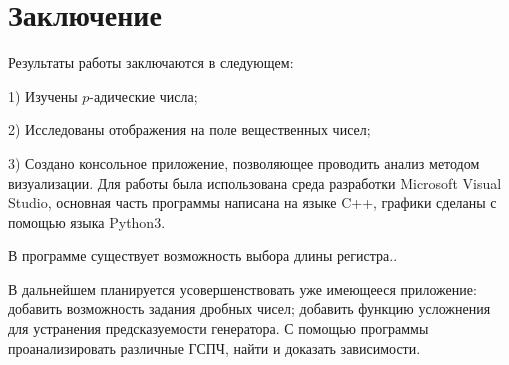 \chapter*{Заключение}						%

Результаты работы заключаются в следующем:

1) Изучены $p$-адические числа; 

2) Исследованы отображения на поле вещественных чисел;

3) Создано консольное приложение, позволяющее проводить анализ методом визуализации. Для работы была использована среда разработки Microsoft Visual Studio, основная часть программы написана на языке C++, графики сделаны с помощью языка Python3.

В программе существует возможность выбора длины регистра..

В дальнейшем планируется усовершенствовать уже имеющееся приложение: добавить возможность задания дробных чисел; добавить функцию усложнения для устранения предсказуемости генератора. С помощью программы проанализировать различные ГСПЧ, найти и доказать зависимости.  



\clearpage
